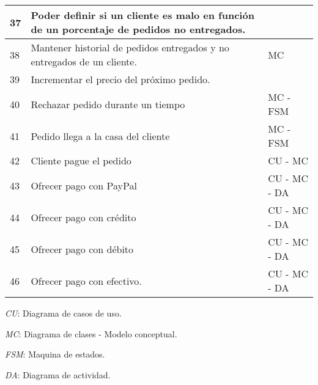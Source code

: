 \begin{center}
\begin{table}[H]
\begin{tabular}{|l|l|l|}
37  &  {\scriptsize Poder definir si un cliente es malo en función de un porcentaje de pedidos no entregados.} &  \\ \hline
38  & Mantener historial de pedidos entregados y no entregados de un cliente.  & MC \\ \hline
39  & Incrementar el precio del próximo pedido. &  \\ \hline
40  & Rechazar pedido durante un tiempo & MC - FSM \\ \hline
41  & Pedido llega a la casa del cliente & MC - FSM \\ \hline
42  & Cliente pague el pedido & CU - MC  \\ \hline
43  & Ofrecer pago con PayPal & CU - MC - DA \\ \hline
44  & Ofrecer pago con crédito & CU - MC - DA \\ \hline
45  & Ofrecer pago con débito & CU - MC - DA  \\ \hline
46  & Ofrecer pago con efectivo.  & CU - MC - DA  \\ \hline
\end{tabular}
\end{table}
\end{center}

\textit{CU}: Diagrama de casos de uso.

\textit{MC}: Diagrama de clases - Modelo conceptual.

\textit{FSM}: Maquina de estados.

\textit{DA}: Diagrama de actividad.

\newpage
